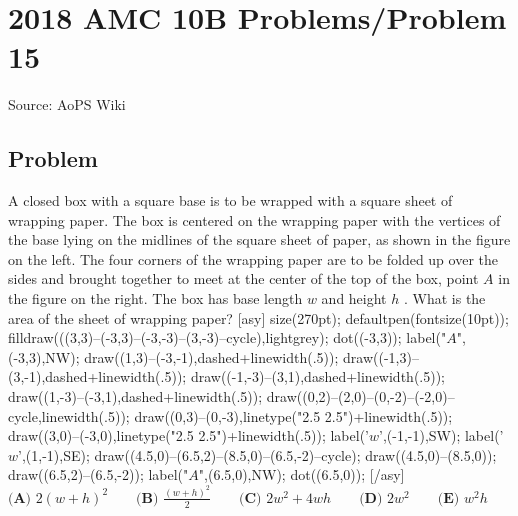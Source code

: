 \documentclass[12pt]{article}
\begin{document}
\section*{{2018 AMC 10B Problems/Problem 15}}
Source: AoPS Wiki

\subsection*{Problem}
A closed box with a square base is to be wrapped with a square sheet of wrapping paper. The box is centered on the wrapping paper with the vertices of the base lying on the midlines of the square sheet of paper, as shown in the figure on the left. The four corners of the wrapping paper are to be folded up over the sides and brought together to meet at the center of the top of the box, point $A$ in the figure on the right. The box has base length $w$ and height $h$ . What is the area of the sheet of wrapping paper? [asy] size(270pt); defaultpen(fontsize(10pt)); filldraw(((3,3)--(-3,3)--(-3,-3)--(3,-3)--cycle),lightgrey); dot((-3,3)); label("$A$",(-3,3),NW); draw((1,3)--(-3,-1),dashed+linewidth(.5)); draw((-1,3)--(3,-1),dashed+linewidth(.5)); draw((-1,-3)--(3,1),dashed+linewidth(.5)); draw((1,-3)--(-3,1),dashed+linewidth(.5)); draw((0,2)--(2,0)--(0,-2)--(-2,0)--cycle,linewidth(.5)); draw((0,3)--(0,-3),linetype("2.5 2.5")+linewidth(.5)); draw((3,0)--(-3,0),linetype("2.5 2.5")+linewidth(.5)); label('$w$',(-1,-1),SW); label('$w$',(1,-1),SE); draw((4.5,0)--(6.5,2)--(8.5,0)--(6.5,-2)--cycle); draw((4.5,0)--(8.5,0)); draw((6.5,2)--(6.5,-2)); label("$A$",(6.5,0),NW); dot((6.5,0)); [/asy] $\textbf{(A) } 2(w+h)^2 \qquad \textbf{(B) } \frac{(w+h)^2}2 \qquad \textbf{(C) } 2w^2+4wh \qquad \textbf{(D) } 2w^2 \qquad \textbf{(E) } w^2h$
\end{document}
